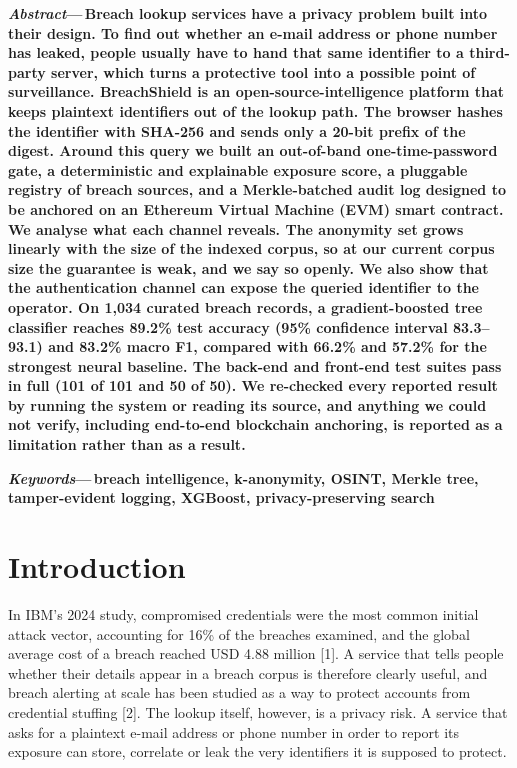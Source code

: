 \documentclass[10pt,twocolumn]{article}
\begin{document}
\noindent\textbf{\textit{Abstract}---\,Breach lookup services have a privacy problem built into their design. To find out whether an e-mail address or phone number has leaked, people usually have to hand that same identifier to a third-party server, which turns a protective tool into a possible point of surveillance. BreachShield is an open-source-intelligence platform that keeps plaintext identifiers out of the lookup path. The browser hashes the identifier with SHA-256 and sends only a 20-bit prefix of the digest. Around this query we built an out-of-band one-time-password gate, a deterministic and explainable exposure score, a pluggable registry of breach sources, and a Merkle-batched audit log designed to be anchored on an Ethereum Virtual Machine (EVM) smart contract. We analyse what each channel reveals. The anonymity set grows linearly with the size of the indexed corpus, so at our current corpus size the guarantee is weak, and we say so openly. We also show that the authentication channel can expose the queried identifier to the operator. On 1,034 curated breach records, a gradient-boosted tree classifier reaches 89.2\% test accuracy (95\% confidence interval 83.3--93.1) and 83.2\% macro F1, compared with 66.2\% and 57.2\% for the strongest neural baseline. The back-end and front-end test suites pass in full (101 of 101 and 50 of 50). We re-checked every reported result by running the system or reading its source, and anything we could not verify, including end-to-end blockchain anchoring, is reported as a limitation rather than as a result.}

\vspace{6pt}
\noindent\textbf{\textit{Keywords}---\,breach intelligence, k-anonymity, OSINT, Merkle tree, tamper-evident logging, XGBoost, privacy-preserving search}

\section{Introduction}

In IBM's 2024 study, compromised credentials were the most common initial attack vector, accounting for 16\% of the breaches examined, and the global average cost of a breach reached USD 4.88 million [1]. A service that tells people whether their details appear in a breach corpus is therefore clearly useful, and breach alerting at scale has been studied as a way to protect accounts from credential stuffing [2]. The lookup itself, however, is a privacy risk. A service that asks for a plaintext e-mail address or phone number in order to report its exposure can store, correlate or leak the very identifiers it is supposed to protect.
\end{document}
